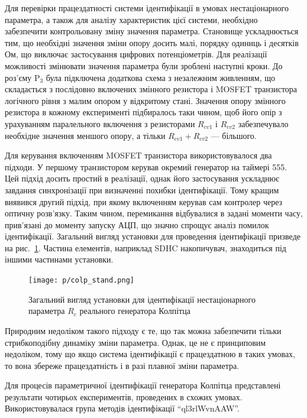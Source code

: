 Для перевірки працездатності системи ідентифікації в умовах
нестаціонарного параметра, а також для аналізу характеристик
цієї системи, необхідно забезпечити контрольовану зміну
значення параметра. Становище ускладнюється тим, що необхідні
значення зміни опору досить малі, порядку одиниць і десятків
Ом, що виключає застосування цифрових потенціометрів. Для
реалізації можливості змінювати значення параметра були
зроблені наступні кроки. До роз'єму
$ \mathrm{P}_3 $ була підключена додаткова схема з незалежним
живленням, що складається з послідовно включених змінного
резистора і MOSFET транзистора логічного рівня з малим опором у
відкритому стані. Значення опору змінного резистора в кожному
експерименті підбиралось таки чином, щоб його опір з урахуванням
паралельного включення з резисторами
$ R_{cv1} $ і
$ R_{cv2} $ забезпечувало необхідне значення меншого опору, а тільки
$ R_{cv1} + R_{cv2 } $ --- більшого.

Для керування включенням MOSFET транзистора використовувалося
два підходи. У першому транзистором керував окремий генератор
на таймері 555. Цей підхід досить простий в реалізації, однак
його застосування ускладнює завдання синхронізації при
визначенні похибки ідентифікації. Тому кращим виявився
другий підхід, при якому включенням керував сам контролер
через оптичну розв'язку. Таким чином, перемикання відбувалися
в задані моменти часу, прив'язані до моменту запуску АЦП,
що значно спрощує аналіз помилок ідентифікації. Загальний
вигляд установки для проведення ідентифікації призведе на
рис.~\ref{atu:f:colp_r_id_dev}. Частина елементів, наприклад SDHC накопичувач,
знаходиться під іншими частинами установки.


\begin{figure}[htb!]
  \centerline{
    \texttt{[image: p/colp\_stand.png]}
  }
\caption{Загальний вигляд установки для ідентифікації нестаціонарного параметра $ R_c $ реального генератора Колпітца}
\label{atu:f:colp_r_id_dev}
\end{figure}

Природним недоліком такого підходу є те, що так можна
забезпечити тільки стрибкоподібну динаміку зміни
параметра. Однак, це не є принциповим недоліком, тому що якщо
система ідентифікації є працездатною в таких умовах, то вона
збереже працездатність і в разі плавної зміни параметра.

Для процесів параметричної ідентифікації генератора Колпітца
представлені результати чотирьох експериментів, проведених в
схожих умовах. Використовувалася група методів ідентифікації
``ql3rlWvnAAW''.

